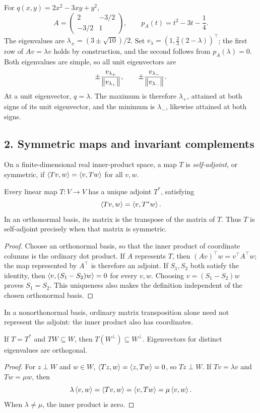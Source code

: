 \begin{example}
For \(q(x,y)=2x^2-3xy+y^2\),
\[
 A=\begin{pmatrix}2&-3/2\\-3/2&1\end{pmatrix},\qquad
 p_A(t)=t^2-3t-\frac14.
\]
The eigenvalues are \(\lambda_\pm=(3\pm\sqrt{10})/2\).
Set \(v_\lambda=(1,\frac23(2-\lambda))^\top\);
the first row of \(Av=\lambda v\) holds by construction, and the
second follows from \(p_A(\lambda)=0\).
Both eigenvalues are simple, so all unit eigenvectors are
\[
 \pm\frac{v_{\lambda_+}}{\left\lVert v_{\lambda_+}\right\rVert},
 \qquad
 \pm\frac{v_{\lambda_-}}{\left\lVert v_{\lambda_-}\right\rVert}.
\]
At a unit eigenvector, \(q=\lambda\). The maximum is therefore
\(\lambda_+\), attained at both signs of its unit eigenvector, and the
minimum is \(\lambda_-\), likewise attained at both signs.
\end{example}

\subsection*{2. Symmetric maps and invariant complements}
On a finite-dimensional real inner-product space, a map \(T\) is
\emph{self-adjoint}, or symmetric, if
\(\left\langle Tv,w\right\rangle=\left\langle v,Tw\right\rangle\) for all \(v,w\).

\begin{proposition}
Every linear map \(T:V\to V\) has a unique adjoint \(T^*\), satisfying
\[
 \left\langle Tv,w\right\rangle=\left\langle v,T^*w\right\rangle.
\]
In an orthonormal basis, its matrix is the transpose of the matrix of
\(T\). Thus \(T\) is self-adjoint precisely when that matrix is symmetric.
\end{proposition}
\begin{proof}
Choose an orthonormal basis, so that the inner product of coordinate
columns is the ordinary dot product. If \(A\) represents \(T\), then
\((Av)^\top w=v^\top A^\top w\); the map represented by \(A^\top\)
is therefore an adjoint. If \(S_1,S_2\) both satisfy the identity, then
\(\left\langle v,(S_1-S_2)w\right\rangle=0\) for every \(v,w\).
Choosing \(v=(S_1-S_2)w\) proves \(S_1=S_2\).
This uniqueness also makes the definition independent of the chosen
orthonormal basis.
\end{proof}
In a nonorthonormal basis, ordinary matrix transposition alone need not
represent the adjoint: the inner product also has coordinates.

\begin{proposition}
If \(T=T^*\) and \(TW\subseteq W\), then \(T(W^\perp)\subseteq W^\perp\).
Eigenvectors for distinct eigenvalues are orthogonal.
\end{proposition}
\begin{proof}
For \(z\perp W\) and \(w\in W\),
\(\left\langle Tz,w\right\rangle=\left\langle z,Tw\right\rangle=0\), so \(Tz\perp W\).
If \(Tv=\lambda v\) and \(Tw=\mu w\), then
\[
 \lambda\left\langle v,w\right\rangle=\left\langle Tv,w\right\rangle=\left\langle v,Tw\right\rangle=\mu\left\langle v,w\right\rangle.
\]
When \(\lambda\ne\mu\), the inner product is zero.
\end{proof}

